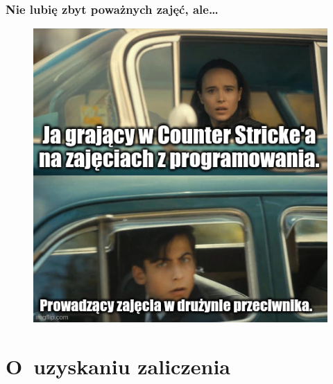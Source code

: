 \documentclass[10pt,t]{beamer}
\begin{document}
\begin{frame}
  \frametitle{Nie lubię zbyt poważnych zajęć, ale\ldots}


  \begin{figure}

    \label{fig:Jak-to-bywa-na-zajeciach}

    \centering


    \includegraphics[scale=0.41]
    {./Presentations-pictures/Jak-to-bywa-na-zajeciach.jpeg}

  \end{figure}

\end{frame}










\section{O~uzyskaniu zaliczenia}
\end{document}
